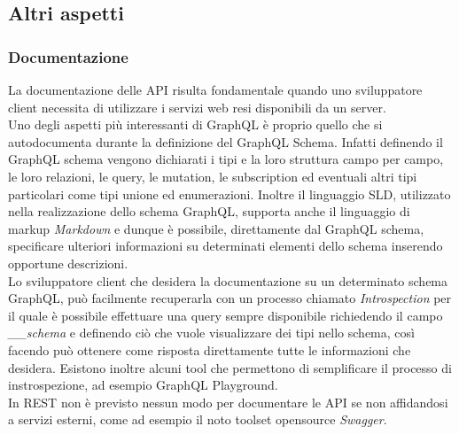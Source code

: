 \subsection{Altri aspetti}
\subsubsection*{Documentazione}
La documentazione delle API risulta fondamentale quando uno sviluppatore client necessita di utilizzare i servizi web resi disponibili da un server.\\
Uno degli aspetti più interessanti di GraphQL è proprio quello che si autodocumenta durante la definizione del GraphQL Schema. Infatti definendo il GraphQL schema vengono dichiarati i tipi e la loro struttura campo per campo, le loro relazioni, le query, le mutation, le subscription ed eventuali altri tipi particolari come tipi unione ed enumerazioni. Inoltre il linguaggio SLD, utilizzato nella realizzazione dello schema GraphQL, supporta anche il linguaggio di markup \textit{Markdown} e dunque è possibile, direttamente dal GraphQL schema, specificare ulteriori informazioni su determinati elementi dello schema inserendo opportune descrizioni.\\
Lo sviluppatore client che desidera la documentazione su un determinato schema GraphQL, può facilmente recuperarla con un processo chiamato \textit{Introspection} per il quale è possibile effettuare una query sempre disponibile richiedendo il campo \textit{\_\_schema} e definendo ciò che vuole visualizzare dei tipi nello schema, così facendo può ottenere come risposta direttamente tutte le informazioni che desidera. Esistono inoltre alcuni tool che permettono di semplificare il processo di instrospezione, ad esempio GraphQL Playground.\\
In REST non è previsto nessun modo per documentare le API se non affidandosi a servizi esterni, come ad esempio il noto toolset opensource \textit{Swagger}.
